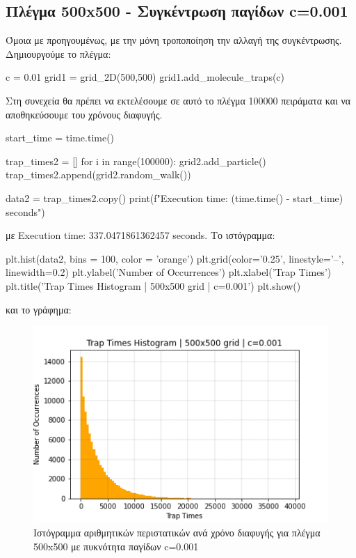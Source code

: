 \subsection{Πλέγμα 500{\en x}500 - Συγκέντρωση παγίδων {\en c}=0.001}
Όμοια με προηγουμένως, με την μόνη τροποποίηση την αλλαγή της συγκέντρωσης. Δημιουργούμε το πλέγμα:
\en 
\begin{python}
c = 0.01
grid1 = grid_2D(500,500)
grid1.add_molecule_traps(c)
\end{python}
\gr 
Στη συνεχεία θα πρέπει να εκτελέσουμε σε αυτό το πλέγμα 100000 πειράματα και να αποθηκεύσουμε του χρόνους διαφυγής.
\en
\begin{python}
start_time = time.time()

trap_times2 = [] 
for i in range(100000):
    grid2.add_particle()
    trap_times2.append(grid2.random_walk())

data2 = trap_times2.copy()
print(f"Execution time: {(time.time() - start_time)} seconds")
\end{python}
\gr 
με {\en Execution time: 337.0471861362457 seconds}. 
\noindent
Το ιστόγραμμα:
\en 
\begin{python}
plt.hist(data2, bins = 100, color = 'orange')
plt.grid(color='0.25', linestyle='--', linewidth=0.2)
plt.ylabel('Number of Occurrences')
plt.xlabel('Trap Times')
plt.title('Trap Times Histogram | 500x500 grid | c=0.001')
plt.show()
\end{python}
\gr και το γράφημα:
\begin{figure}[H]
\begin{center}
\includegraphics[scale=0.9]{figures/TRW_0001_hist.png}
\caption{Ιστόγραμμα αριθμητικών περιστατικών ανά χρόνο διαφυγής για πλέγμα 500{\en x}500 με πυκνότητα παγίδων {\en c}=0.001}
\end{center}
\end{figure}
